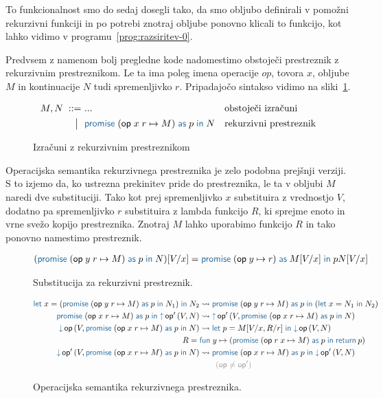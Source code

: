 To funkcionalnost smo do sedaj dosegli tako, da smo obljubo definirali v pomožni rekurzivni funkciji in po potrebi znotraj obljube ponovno klicali to funkcijo, kot lahko vidimo v programu~\ref{prog:razsiritev-0}.


Predvsem z namenom bolj pregledne kode nadomestimo obstoječi prestreznik z rekurzivnim prestreznikom. Le ta ima poleg imena operacije $op$, tovora $x$, obljube $M$ in kontinuacije $N$ tudi spremenljivko $r$. Pripadajočo sintakso vidimo na sliki~\ref{fig:izrazi-prestreznik}.


\begin{figure}[H]
	\centering
	\small
	\begin{align*}
		M, N
		\bnfis& ...                            & &\text{obstoječi izračuni} \\
		\bnfor& \tmwithrec{op}{x}{r}{M}{p}{N}  & &\text{rekurzivni prestreznik}
	\end{align*}
	
	\caption{Izračuni z rekurzivnim prestreznikom}
	\label{fig:izrazi-prestreznik}
\end{figure}


Operacijska semantika rekurzivnega prestreznika je zelo podobna prejšnji verziji. S to izjemo da, ko ustrezna prekinitev pride do prestreznika, le ta v obljubi $M$ naredi dve substituciji. Tako kot prej spremenljivko $x$ substituira z vrednostjo $V$, dodatno pa spremenljivko $r$ substituira z lambda funkcijo $R$, ki sprejme enoto in vrne svežo kopijo prestreznika. Znotraj $M$ lahko uporabimo funkcijo $R$ in tako ponovno namestimo prestreznik.   

\begin{figure}[H]
	\centering
	\small
	\begin{align*}
		(\tmwithrec{op}{y}{r}{M}{p}{N})[V/x] &= \tmwith{op}{y}{r}{M[V/x]}{p}{N[V/x]}
	\end{align*}
	\caption{Substitucija za rekurzivni prestreznik.}
	\label{fig:substitucija-prestreznik}
\end{figure}

\begin{figure}[H]
	\centering
	\small
	\begin{align*}
		\tmlet{x}{(\tmwithrec{op}{y}{r}{M}{p}{N_1})}{N_2} &\reduces \tmwithrec{op}{y}{r}{M}{p}{(\tmlet{x}{N_1}{N_2})}
		\\
		\tmwithrec{op}{x}{r}{M}{p}{\tmopout{op'}{V}{N}} &\reduces \tmopout{op'}{V}{\tmwithrec{op}{x}{r}{M}{p}{N}}
		\\
		\tmopin{op}{V}{\tmwithrec{op}{x}{r}{M}{p}{N}} &\reduces \tmlet{p}{M[V/x, R/r]}{\tmopin{op}{V}{N}} \\
		R = \;& \tmfunano{y}{(\tmwithrec{op}{r}{x}{M}{p}{\tmreturn{p}})} \\
		\tmopin{op'}{V}{\tmwithrec{op}{x}{r}{M}{p}{N}} &\reduces \tmwithrec{op}{x}{r}{M}{p}{\tmopin{op'}{V}{N}} \\
		&\qquad {\color{rulenameColor}(\op \neq \op')}
	\end{align*}
	
	\caption{Operacijska semantika rekurzivnega prestreznika.}
	\label{fig:semantika-prestreznik}
\end{figure}

